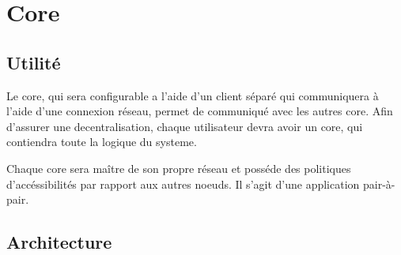 \section{Core}
\subsection{Utilité}
Le core, qui sera configurable a l'aide d'un client séparé qui communiquera
à l'aide d'une connexion réseau, permet de communiqué avec les autres core.
Afin d'assurer une decentralisation, chaque utilisateur devra avoir un core,
qui contiendra toute la logique du systeme.

Chaque core sera maître de son propre réseau et posséde des politiques d'accéssibilités
par rapport aux autres noeuds. Il s'agit d'une application pair-à-pair.

\subsection{Architecture}
